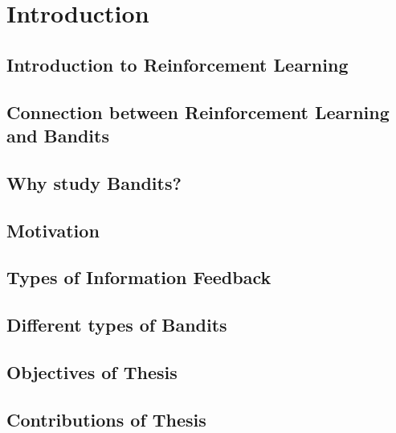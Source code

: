 \documentclass[MS]{iitmdiss}
\begin{document}
\pagebreak
\clearpage



\chapter{Introduction}
\label{chap:intro}

\section{Introduction to Reinforcement Learning}
\label{intro}


\section{Connection between Reinforcement Learning and Bandits}
\label{conn:Bandits}


\section{Why study Bandits?}
\label{study}


\section{Motivation}
\label{motivation}



\section{Types of Information Feedback}
\label{feed}



\section{Different types of Bandits}
\label{types}



\section{Objectives of Thesis}
\label{objThesis}


\section{Contributions of Thesis}
\label{contriThesis}

\end{document}
